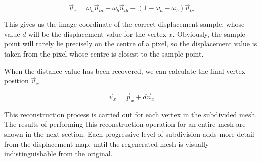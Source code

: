 \begin{equation} \label{eqn:calcpixel}
\vec{u}_x = \omega_a \vec{u}_{ta} + \omega_b \vec{u}_{tb} + (1 - \omega_a - \omega_b) \vec{u}_{tc}
\end{equation}

This gives us the image coordinate of the correct displacement sample, whose value $d$ will be the displacement value for the vertex $x$. Obviously, the sample point will rarely lie precisely on the centre of a pixel, so the displacement value is taken from the pixel whose centre is closest to the sample point.

When the distance value has been recovered, we can calculate the final vertex position $\vec{v}_x$.

\begin{equation}
\vec{v}_x = \vec{p}_x + d \vec{n}_x
\end{equation}

This reconstruction process is carried out for each vertex in the subdivided mesh. The results of performing this reconstruction operation for an entire mesh are shown in the next section. Each progressive level of subdivision adds more detail from the displacement map, until the regenerated mesh is visually indistinguishable from the original.

